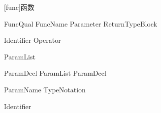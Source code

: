 
[func]{函数}

\begin{bnf}
 \br
    FuncQual\bnfs {} FuncName Parameter ReturnType\bnfq Block
\end{bnf}

\begin{bnf}
 \br
    Identifier \br
     \br
     \br
     Operator
\end{bnf}

\begin{bnf}
 \br
    \terminal{(} ParamList\bnfq \terminal{)}
\end{bnf}

\begin{bnf}
 \br
    ParamDecl \br
    ParamList \terminal{,} ParamDecl
\end{bnf}

\begin{bnf}
 \br
    ParamName TypeNotation\bnfq
\end{bnf}

\begin{bnf}
 \br
    Identifier \br
\end{bnf}